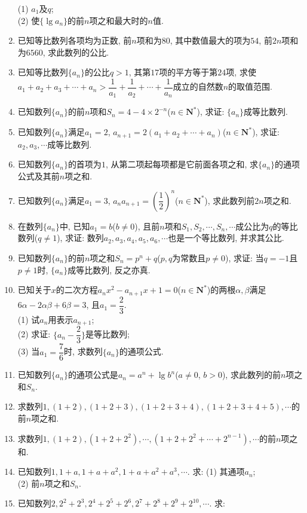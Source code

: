 \documentclass[10pt,a4paper]{article}
\begin{document}
\begin{enumerate}[1.]
(1) $a_1$及$q$;\\
(2) 使$\{\lg a_n\}$的前$n$项之和最大时的$n$值.
\item 已知等比数列各项均为正数, 前$n$项和为$80$, 其中数值最大的项为$54$, 前$2n$项和为$6560$, 求此数列的公比.
\item 已知等比数列$\{a_n\}$的公比$q>1$, 其第$17$项的平方等于第$24$项, 求使$a_1+a_2+a_3+\cdots +a_n>\dfrac 1{a_1}+\dfrac 1{a_2}+\cdots +\dfrac 1{a_n}$成立的自然数$n$的取值范围.
\item 已知数列$\{a_n\}$的前$n$项和$S_n=4-4\times 2^{-n}$($n\in \mathbf{N}^*$), 求证: $\{a_n\}$成等比数列.
\item 已知数列$\{a_n\}$满足$a_1=2$, $a_{n+1}=2(a_1+a_2+\cdots +a_n)$($n\in \mathbf{N}^*$), 求证: $a_2,a_3, \cdots$成等比数列.
\item 已知数列$\{a_n\}$的首项为$1$, 从第二项起每项都是它前面各项之和, 求$\{a_n\}$的通项公式及其前$n$项之和.
\item 已知数列$\{a_n\}$满足$a_1=3$, $a_na_{n+1}=(\dfrac 12)^n$($n\in \mathbf{N}^*$), 求此数列前$2n$项之和.
\item 在数列$\{a_n\}$中, 已知$a_1=b$($b\ne 0$), 且前$n$项和$S_1,S_2,\cdots,S_n,\cdots$成公比为$q$的等比数列($q\ne 1$), 求证: 数列$a_2,a_3,a_4,a_5,a_6,\cdots$也是一个等比数列, 并求其公比.
\item 已知数列$\{a_n\}$的前$n$项之和$S_n=p^n+q$($p,q$为常数且$p\ne 0$), 求证: 当$q=-1$且$p\ne 1$时, $\{a_n\}$成等比数列, 反之亦真.
\item 已知关于$x$的二次方程$a_nx^2-a_{n+1}x+1=0$($n\in \mathbf{N}^*$)的两根$\alpha ,\beta$满足$6\alpha -2\alpha \beta +6\beta =3$, 且$a_1=\dfrac 23$.\\
(1) 试$a_n$用表示$a_{n+1}$;\\
(2) 求证: $\{a_n-\dfrac 23\}$是等比数列;\\
(3) 当$a_1=\dfrac 76$时, 求数列$\{a_n\}$的通项公式.
\item 已知数列$\{a_n\}$的通项公式是$a_n=a^n+\lg b^n$($a\ne 0$, $b>0$), 求此数列的前$n$项之和$S_n$.
\item 求数列$1,(1+2),(1+2+3),(1+2+3+4),(1+2+3+4+5), \cdots$的前$n$项之和.
\item 求数列$1,(1+2),(1+2+2^2), \cdots, (1+2+2^2+\cdots +2^{n-1}), \cdots$的前$n$项之和.
\item 已知数列$1,1+a,1+a+a^2,1+a+a^2+a^3, \cdots$. 求:
(1) 其通项$a_n$;\\
(2) 前$n$项之和$S_n$.
\item 已知数列$2,2^2+2^3,2^4+2^5+2^6,2^7+2^8+2^9+2^{10}, \cdots$. 求:\\

\end{enumerate}
\end{document}
